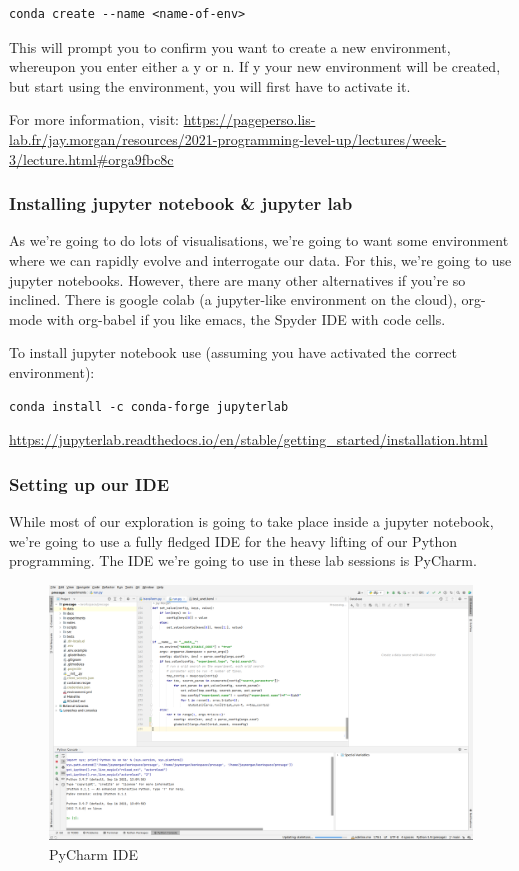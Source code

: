 \documentclass[10pt]{beamer}
\begin{document}
\begin{verbatim}
conda create --name <name-of-env>
\end{verbatim}

This will prompt you to confirm you want to create a new environment, whereupon you
enter either a y or n. If y your new environment will be created, but start using the
environment, you will first have to activate it.

For more information, visit:
\url{https://pageperso.lis-lab.fr/jay.morgan/resources/2021-programming-level-up/lectures/week-3/lecture.html\#orga9fbc8c}


\subsubsection*{Installing jupyter notebook \& jupyter lab}
\label{sec:org6aa2fc5}

As we're going to do lots of visualisations, we're going to want some environment
where we can rapidly evolve and interrogate our data. For this, we're going to use
jupyter notebooks. However, there are many other alternatives if you're so
inclined. There is google colab (a jupyter-like environment on the cloud), org-mode
with org-babel if you like emacs, the Spyder IDE with code cells.

To install jupyter notebook use (assuming you have activated the correct environment):

\begin{verbatim}
conda install -c conda-forge jupyterlab
\end{verbatim}

\url{https://jupyterlab.readthedocs.io/en/stable/getting\_started/installation.html}

\subsubsection*{Setting up our IDE}
\label{sec:orgf2c8222}

While most of our exploration is going to take place inside a jupyter notebook,
we're going to use a fully fledged IDE for the heavy lifting of our Python
programming. The IDE we're going to use in these lab sessions is PyCharm.

\begin{figure}[htbp]
\centering
\includegraphics[width=.9\linewidth]{images/pycharm.png}
\caption{PyCharm IDE}
\end{figure}
\end{document}
